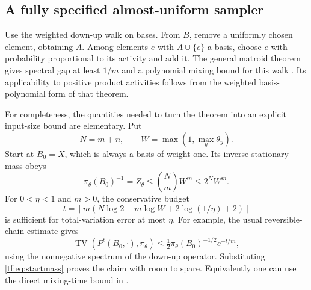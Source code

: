 \documentclass[11pt]{article}
\numberwithin{equation}{section}
\theoremstyle{definition}
\newcommand{\TV}{\operatorname{TV}}
\begin{document}
\subsection{A fully specified almost-uniform sampler}
Use the weighted down-up walk on bases. From $B$, remove a uniformly
chosen element, obtaining $A$. Among elements $e$ with $A\cup\{e\}$ a
basis, choose $e$ with probability proportional to its activity and add
it. The general matroid theorem gives spectral gap at least $1/m$ and a
polynomial mixing bound for this walk \cite{ALOV}. Its applicability to
positive product activities follows from the weighted basis-polynomial
form of that theorem.

For completeness, the quantities needed to turn the theorem into an
explicit input-size bound are elementary. Put
\[
 N=m+n,\qquad W=\max(1,\max_y\theta_y).
\]
Start at $B_0=X$, which is always a basis of weight one. Its inverse
stationary mass obeys
\begin{equation}
 \pi_\theta(B_0)^{-1}=Z_\theta
 \le \binom NmW^m\le 2^N W^m.
 \label{tf:eq:startmass}
\end{equation}
For $0<\eta<1$ and $m>0$, the conservative budget
\begin{equation}
 t=\left\lceil m\left(N\log2+m\log W
                  +2\log(1/\eta)+2\right)\right\rceil
 \label{tf:eq:budget}
\end{equation}
is sufficient for total-variation error at most $\eta$. For example, the
usual reversible-chain estimate gives
\[
 \TV(P^t(B_0,\cdot),\pi_\theta)
 \le\tfrac12\pi_\theta(B_0)^{-1/2}e^{-t/m},
\]
using the nonnegative spectrum of the down-up operator. Substituting
\eqref{tf:eq:startmass} proves the claim with room to spare. Equivalently one
can use the direct mixing-time bound in \cite[Theorem~1.1]{ALOV}.
\end{document}
